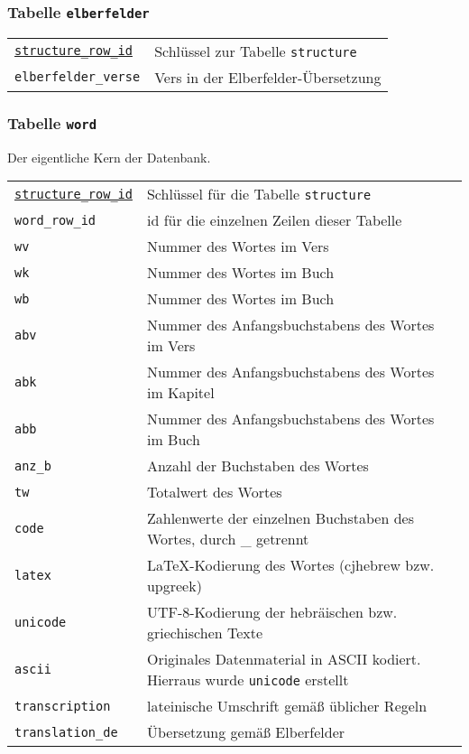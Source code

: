 \documentclass[a4paper]{scrartcl}
\begin{document}
\subsubsection{Tabelle \texttt{elberfelder}}

\begin{tabular}{l|l}
\texttt{\underline{structure\_row\_id}}	& Schlüssel zur Tabelle \texttt{structure}	\\
\texttt{elberfelder\_verse}	& Vers in der Elberfelder-Übersetzung		\\
\end{tabular}

\subsubsection{Tabelle \texttt{word}}

Der eigentliche Kern der Datenbank.

\begin{tabular}{l|l}
\texttt{\underline{structure\_row\_id}}	& Schlüssel für die Tabelle \texttt{structure}	\\
\texttt{word\_row\_id}		& id für die einzelnen Zeilen dieser Tabelle	\\
\texttt{wv}					& Nummer des Wortes im Vers	\\
\texttt{wk}					& Nummer des Wortes im Buch	\\
\texttt{wb}					& Nummer des Wortes im Buch	\\
\texttt{abv}				& Nummer des Anfangsbuchstabens des Wortes im Vers	\\
\texttt{abk}				& Nummer des Anfangsbuchstabens des Wortes im Kapitel	\\
\texttt{abb}				& Nummer des Anfangsbuchstabens des Wortes im Buch	\\
\texttt{anz\_b}				& Anzahl der Buchstaben des Wortes	\\
\texttt{tw}					& Totalwert des Wortes	\\
\texttt{code}				& Zahlenwerte der einzelnen Buchstaben des Wortes, durch \_ getrennt	\\
\texttt{latex}				& \LaTeX-Kodierung des Wortes (cjhebrew bzw. upgreek)	\\
\texttt{unicode}			& UTF-8-Kodierung der hebräischen bzw. griechischen Texte	\\
\texttt{ascii}				& Originales Datenmaterial in ASCII kodiert. Hierraus wurde \texttt{unicode} erstellt	\\
\texttt{transcription}		& lateinische Umschrift gemäß üblicher Regeln	\\
\texttt{translation\_de}	& Übersetzung gemäß Elberfelder	\\
\end{tabular}
\end{document}
